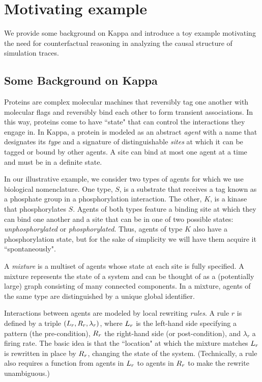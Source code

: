 
\section{Motivating example}\label{sec:example}

We provide some background on Kappa and introduce a toy
example motivating the need for counterfactual reasoning in analyzing
the causal structure of simulation traces.

\subsection{Some Background on Kappa}\label{sec:background}

Proteins are complex molecular machines that reversibly tag one
another with molecular flags and reversibly bind each other to form
transient associations.  In this way, proteins come to have ``state"
that can control the interactions they engage in. In Kappa, a protein
is modeled as an abstract \emph{agent} with a name that designates its
\emph{type} and a signature of distinguishable \emph{sites} at which
it can be tagged or bound by other agents. A site can bind at most one
agent at a time and must be in a definite state.

In our illustrative example, we consider two types of agents for which
we use biological nomenclature. One type, $S$, is a substrate that
receives a tag known as a phosphate group in a phosphorylation
interaction. The other, $K$, is a kinase that phosphorylates
$S$. Agents of both types feature a binding site at which they can
bind one another and a site that can be in one of two possible states:
\emph{unphosphorylated} or \emph{phosphorylated}. Thus, agents of type
$K$ also have a phosphorylation state, but for the sake of simplicity
we will have them acquire it ``spontaneously".

A \emph{mixture} is a multiset of agents whose state at each site is
fully specified. A mixture represents the state of a system and can be
thought of as a (potentially large) graph consisting of many connected
components. In a mixture, agents of the same type are distinguished by
a unique global identifier. %



Interactions between agents are modeled by local rewriting
\emph{rules}.  A rule $r$ is defined by a triple
$(L_{r}, R_{r}, \lambda_r)$, where $L_{r}$ is the left-hand
side specifying a pattern (the pre-condition), $R_{r}$ the
right-hand side (or post-condition), and $\lambda_r$ a firing rate.
The basic idea is that the ``location" at which the mixture matches
$L_{r}$ is rewritten in place by $R_{r}$, changing the state of
the system. (Technically, a rule also requires a function from agents
in $L_{r}$ to agents in $R_{r}$ to make the rewrite
unambiguous.)

